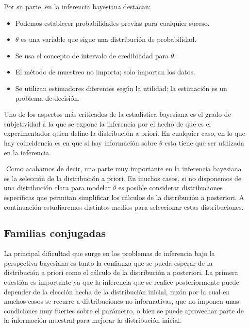 \documentclass{article}
\begin{document}
Por su parte, en la inferencia bayesiana destacan:

\begin{itemize}
	\item Podemos establecer probabilidades previas para cualquier suceso.
	\item $\theta$ es una variable que sigue una distribución de probabilidad.
	\item Se usa el concepto de intervalo de credibilidad para $\theta$.%
	\item El método de muestreo no importa; solo importan los datos.
	\item Se utilizan estimadores diferentes según la utilidad; la estimación es un problema de decisión.
\end{itemize}

Uno de los aspectos más criticados de la estadística bayesiana es el grado de subjetividad a la que se expone la inferencia por el hecho de que es el experimentador quien define la distribución a priori. En cualquier caso, en lo que hay coincidencia es en que si hay información sobre $\theta$ esta tiene que ser utilizada en la inferencia.

$ $ \newline
Como acabamos de decir, una parte muy importante en la inferencia bayesiana es la selección de la distribución a priori. En muchos casos, si no disponemos de una distribución clara para modelar $\theta$ es posible considerar distribuciones específicas que permitan simplificar los cálculos de la distribución a posteriori. A continuación estudiaremos distintos medios para seleccionar estas distribuciones.

\subsection{Familias conjugadas}

La principal dificultad que surge en los problemas de inferencia bajo la perspectiva bayesiana es tanto la confianza que se pueda esperar de la distribución a priori como el cálculo de la distribución a posteriori. La primera cuestión es importante ya que la inferencia que se realice posteriormente puede depender de la elección hecha de la distribución inicial, razón por la cual en muchos casos se recurre a distribuciones no informativas, que no imponen unas condiciones muy fuertes sobre el parámetro, o bien se puede aprovechar parte de la información muestral para mejorar la distribución inicial.%
\end{document}
